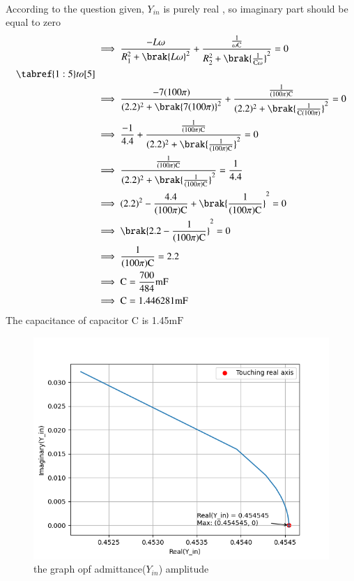 \documentclass[a4,12pt,onecolumn]{IEEEtran}
\begin{document}
\\ According to the question given, $Y_{in}$ is purely real , so imaginary part should be equal to zero\\
\begin{align}
&\implies \frac{-L\omega}{R_1^2+\brak{L\omega}^2} + \frac{\frac{1}{ \omega \text{C}}}{R_2^2+\brak{\frac{1}{ \text{C}\omega}}^2}=0\\
\tabref{1:5} to \ref{5}\\
&\implies \frac{-7(100\pi)}{(2.2)^2+\brak{7(100\pi)}^2} + \frac{\frac{1}{ (100\pi) \text{C}}}{(2.2)^2+\brak{\frac{1}{\text{C}(100\pi)}}^2}=0\\
&\implies  \frac{-1}{4.4}+\frac{\frac{1}{ (100\pi) \text{C}}}{(2.2)^2+\brak{\frac{1}{ (100\pi) \text{C}}}^2}=0\\
&\implies \frac{\frac{1}{ (100\pi) \text{C}}}{(2.2)^2+\brak{\frac{1}{ (100\pi) \text{C}}}^2}=\frac{1}{4.4}\\
&\implies  (2.2)^2-\frac{4.4}{ (100\pi) \text{C}}+\brak{\frac{1}{ (100\pi) \text{C}}}^2=0\\
&\implies  \brak{2.2-\frac{1}{ (100\pi) \text{C}}}^2=0\\
&\implies  \frac{1}{ (100\pi) \text{C}}=2.2\\
&\implies  \text{C}=\frac{700}{484}\text{mF}\\
&\implies  \text{C}=1.446281\text{mF}
\end{align}
The capacitance of capacitor $\text{C}$ is 1.45$\text{mF}$
\begin{figure}[ht!]
\includegraphics[width=\columnwidth]{figs/fig2.png}
\caption{the graph opf admittance($Y_{in}$) amplitude}
\end{figure}
\end{document}
